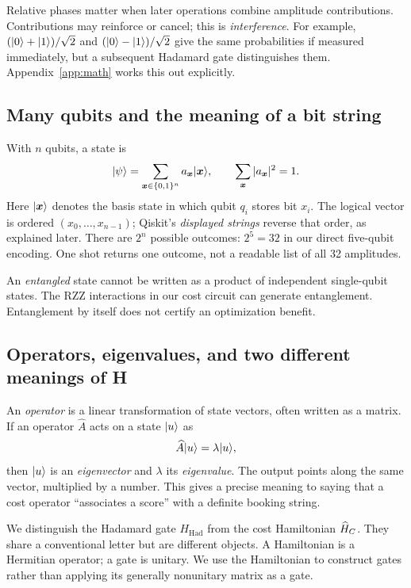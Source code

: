 Relative phases matter when later operations combine amplitude contributions.
Contributions may reinforce or cancel; this is \emph{interference}. For example,
$(\lvert 0\rangle+\lvert 1\rangle)/\sqrt2$ and $(\lvert 0\rangle-\lvert 1\rangle)/\sqrt2$ give the same probabilities
if measured immediately, but a subsequent Hadamard gate distinguishes them.
Appendix~\ref{app:math} works this out explicitly.

\subsection{Many qubits and the meaning of a bit string}
With $n$ qubits, a state is
\begin{equation}\label{eq:n-state}
\lvert \psi\rangle=\sum_{\boldsymbol{x}\in\{0,1\}^n}a_{\boldsymbol{x}}\lvert \boldsymbol{x}\rangle,
\qquad \sum_{\boldsymbol{x}}|a_{\boldsymbol{x}}|^2=1.
\end{equation}
Here $\lvert \boldsymbol{x}\rangle$ denotes the basis state in which qubit $q_i$ stores
bit $x_i$. The logical vector is ordered $(x_0,\ldots,x_{n-1})$; Qiskit's
\emph{displayed strings} reverse that order, as explained later. There are
$2^n$ possible outcomes: $2^5=32$ in our direct five-qubit encoding. One shot
returns one outcome, not a readable list of all 32 amplitudes.

An \emph{entangled} state cannot be written as a product of independent
single-qubit states. The RZZ interactions in our cost circuit can generate
entanglement. Entanglement by itself does not certify an optimization benefit.

\subsection{Operators, eigenvalues, and two different meanings of H}
An \emph{operator} is a linear transformation of state vectors, often written
as a matrix. If an operator $\widehat A$ acts on a state $\lvert u\rangle$ as
\begin{equation}
\widehat A\lvert u\rangle=\lambda\lvert u\rangle,
\end{equation}
then $\lvert u\rangle$ is an \emph{eigenvector} and $\lambda$ its \emph{eigenvalue}.
The output points along the same vector, multiplied by a number. This gives a
precise meaning to saying that a cost operator ``associates a score'' with a
definite booking string.

We distinguish the Hadamard gate $H_{\mathrm{Had}}$ from the cost Hamiltonian
$\widehat H_C$. They share a conventional letter but are different objects. A
Hamiltonian is a Hermitian operator; a gate is unitary. We use the Hamiltonian
to construct gates rather than applying its generally nonunitary matrix as a gate.

